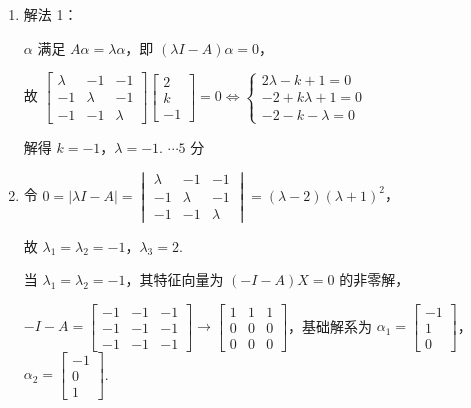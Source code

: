 \documentclass[a4paper,11pt]{ctexart}
\newcommand{\score}[1]{\hfill$\cdots\text{#1 分}$}
\begin{document}
\begin{enumerate}[label=(\arabic*), leftmargin=2.4em, itemsep=0.4em, topsep=0.3em]
  \item 解法 1：

  $\alpha$ 满足 $A\alpha = \lambda\alpha$，即 $(\lambda I - A)\alpha = 0$，

  故 $\begin{bmatrix} \lambda & -1 & -1 \\ -1 & \lambda & -1 \\ -1 & -1 & \lambda \end{bmatrix}\begin{bmatrix} 2 \\ k \\ -1 \end{bmatrix} = 0 \Leftrightarrow \begin{cases} 2\lambda - k + 1 = 0 \\ -2 + k\lambda + 1 = 0 \\ -2 - k - \lambda = 0 \end{cases}$

  解得 $k = -1$，$\lambda = -1$. \score{5}

  \item 令 $0 = |\lambda I - A| = \begin{vmatrix} \lambda & -1 & -1 \\ -1 & \lambda & -1 \\ -1 & -1 & \lambda \end{vmatrix} = (\lambda - 2)(\lambda + 1)^2$，

  故 $\lambda_1 = \lambda_2 = -1$，$\lambda_3 = 2$.

  当 $\lambda_1 = \lambda_2 = -1$，其特征向量为 $(-I - A)X = 0$ 的非零解，

  $-I - A = \begin{bmatrix} -1 & -1 & -1 \\ -1 & -1 & -1 \\ -1 & -1 & -1 \end{bmatrix} \to \begin{bmatrix} 1 & 1 & 1 \\ 0 & 0 & 0 \\ 0 & 0 & 0 \end{bmatrix}$，基础解系为 $\alpha_1 = \begin{bmatrix} -1 \\ 1 \\ 0 \end{bmatrix}$，$\alpha_2 = \begin{bmatrix} -1 \\ 0 \\ 1 \end{bmatrix}$.


\end{enumerate}
\end{document}
